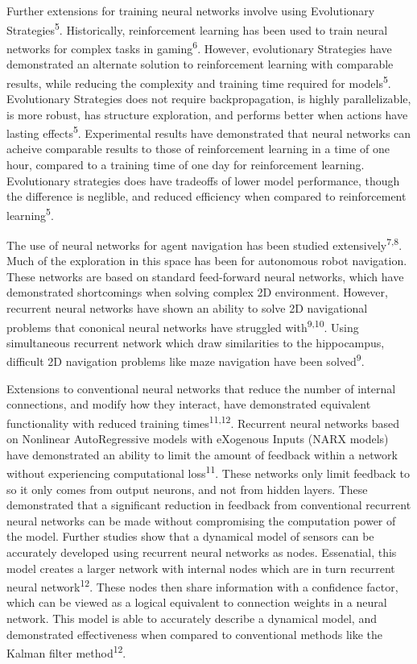 \documentclass[journal]{IEEEtran}
\begin{document}
    Further extensions for training neural networks involve using Evolutionary Strategies\textsuperscript{5}. Historically, reinforcement learning has been used to train neural networks for complex tasks in gaming\textsuperscript{6}. However, evolutionary Strategies
    have demonstrated an alternate solution to reinforcement learning with comparable results, while reducing the complexity and training time required for models\textsuperscript{5}. Evolutionary Strategies does not require backpropagation, is highly parallelizable, is more robust, 
    has structure exploration, and performs better when actions have lasting effects\textsuperscript{5}. Experimental results have demonstrated that neural networks can acheive comparable results to those of reinforcement learning in a time of one hour, compared to a training
    time of one day for reinforcement learning. Evolutionary strategies does have tradeoffs of lower model performance, though the difference is neglible, and reduced efficiency when compared to reinforcement learning\textsuperscript{5}.

    The use of neural networks for agent navigation has been studied extensively\textsuperscript{7,8}. Much of the exploration in this space has been for autonomous robot navigation. These networks are based on standard feed-forward neural networks, which have
    demonstrated shortcomings when solving complex 2D environment. However, recurrent neural networks have shown an ability to solve 2D navigational problems that cononical neural networks have struggled with\textsuperscript{9,10}. Using simultaneous recurrent network
    which draw similarities to the hippocampus, difficult 2D navigation problems like maze navigation have been solved\textsuperscript{9}.

    Extensions to conventional neural networks that reduce the number of internal connections, and modify how they interact, have demonstrated equivalent functionality with reduced training times\textsuperscript{11,12}. Recurrent neural networks based on 
    Nonlinear AutoRegressive models with eXogenous Inputs (NARX models) have demonstrated an ability to limit the amount of feedback within a network without experiencing computational loss\textsuperscript{11}. These networks only limit feedback to so it only comes 
    from output neurons, and not from hidden layers. These demonstrated that a significant reduction in feedback from conventional recurrent neural networks can be made without compromising the computation power of the model. Further studies show that a dynamical model 
    of sensors can be accurately developed using recurrent neural networks as nodes. Essenatial, this model creates a larger network with internal nodes which are in turn recurrent neural network\textsuperscript{12}. These nodes then share information with a confidence factor, which can
    be viewed as a logical equivalent to connection weights in a neural network. This model is able to accurately describe a dynamical model, and demonstrated effectiveness when compared to conventional methods like the Kalman filter method\textsuperscript{12}. 
\end{document}
